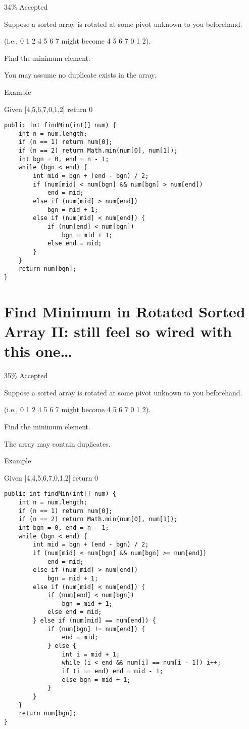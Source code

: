 \documentclass[9pt, b5paaper]{book}
\begin{document}
34\% Accepted

Suppose a sorted array is rotated at some pivot unknown to you beforehand.

(i.e., 0 1 2 4 5 6 7 might become 4 5 6 7 0 1 2).

Find the minimum element.

You may assume no duplicate exists in the array.

Example

Given [4,5,6,7,0,1,2] return 0
\begin{verbatim}
public int findMin(int[] num) {
    int n = num.length;
    if (n == 1) return num[0];
    if (n == 2) return Math.min(num[0], num[1]);
    int bgn = 0, end = n - 1;
    while (bgn < end) {
        int mid = bgn + (end - bgn) / 2;
        if (num[mid] < num[bgn] && num[bgn] > num[end])
            end = mid;
        else if (num[mid] > num[end])
            bgn = mid + 1;
        else if (num[mid] < num[end]) {
            if (num[end] < num[bgn])
                bgn = mid + 1;
            else end = mid;
        }  
    }
    return num[bgn];
}
\end{verbatim}
\section{Find Minimum in Rotated Sorted Array II: still feel so wired with this one\ldots{}}
\label{sec-5-29}

35\% Accepted

Suppose a sorted array is rotated at some pivot unknown to you beforehand.

(i.e., 0 1 2 4 5 6 7 might become 4 5 6 7 0 1 2).

Find the minimum element.

The array may contain duplicates.

Example

Given [4,4,5,6,7,0,1,2] return 0
\begin{verbatim}
public int findMin(int[] num) {
    int n = num.length;
    if (n == 1) return num[0];
    if (n == 2) return Math.min(num[0], num[1]);
    int bgn = 0, end = n - 1;
    while (bgn < end) {
        int mid = bgn + (end - bgn) / 2;
        if (num[mid] < num[bgn] && num[bgn] >= num[end])
            end = mid;
        else if (num[mid] > num[end])
            bgn = mid + 1;
        else if (num[mid] < num[end]) {
            if (num[end] < num[bgn])
                bgn = mid + 1;
            else end = mid;
        } else if (num[mid] == num[end]) {
            if (num[bgn] != num[end]) {
                end = mid;
            } else {
                int i = mid + 1;
                while (i < end && num[i] == num[i - 1]) i++;
                if (i == end) end = mid - 1;
                else bgn = mid + 1;
            }
        }
    }
    return num[bgn];
}
\end{verbatim}
\end{document}
